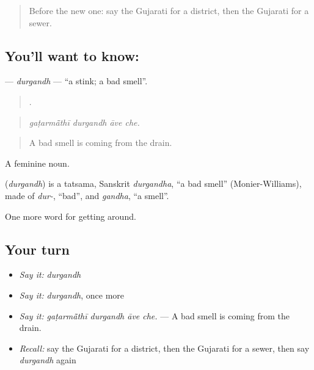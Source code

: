 \begin{quote}
Before the new one: say the Gujarati for a district, then the Gujarati for a sewer.
\end{quote}

\subsection*{You'll want to know: }
\textbf{} — \emph{durgandh} — \textquotedblleft{}a stink; a bad smell\textquotedblright{}.

\begin{quote}
   .
\end{quote}

\begin{quote}
\emph{gaṭarmā̃thī durgandh āve che.}
\end{quote}

\begin{quote}
A bad smell is coming from the drain.
\end{quote}

A feminine noun.

\begin{cousinweb}
\textbf{} (\emph{durgandh}) is a tatsama, Sanskrit \emph{durgandha}, \textquotedblleft{}a bad smell\textquotedblright{} (Monier-Williams), made of \emph{dur-}, \textquotedblleft{}bad\textquotedblright{}, and \emph{gandha}, \textquotedblleft{}a smell\textquotedblright{}.
\end{cousinweb}

\begin{grammarlens}[title={What you've built}]
One more word for getting around.
\end{grammarlens}

\subsection*{Your turn}
\begin{itemize}
\raggedright
  \item \emph{Say it:} \emph{durgandh}
  \item \emph{Say it:} \emph{durgandh}, once more
  \item \emph{Say it:} \emph{gaṭarmā̃thī durgandh āve che.} — A bad smell is coming from the drain.
  \item \emph{Recall:} say the Gujarati for a district, then the Gujarati for a sewer, then say \emph{durgandh} again
\end{itemize}

